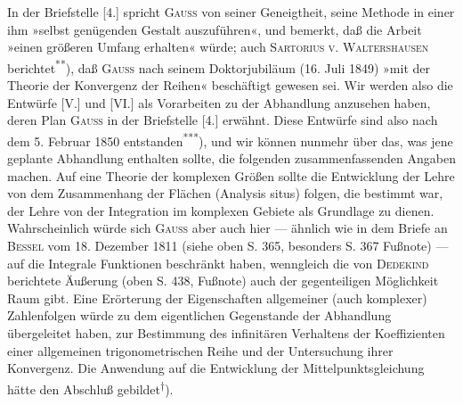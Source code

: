 \par\medskip\indent In der Briefstelle [4.] spricht \textsc{Gauss} von seiner Geneigtheit, seine Methode in einer ihm »selbst genügenden Gestalt auszuführen«, und bemerkt, daß die Arbeit »einen größeren Umfang erhalten« würde; auch \textsc{Sartorius v. Waltershausen} berichtet\textsuperscript{**}), daß \textsc{Gauss} nach seinem Doktorjubiläum (16. Juli 1849) »mit der Theorie der Konvergenz der Reihen« beschäftigt gewesen sei. Wir werden also die Entwürfe [V.] und [VI.] als Vorarbeiten zu der Abhandlung anzusehen haben, deren Plan \textsc{Gauss} in der Briefstelle [4.] erwähnt. Diese Entwürfe sind also nach dem 5. Februar 1850 entstanden\textsuperscript{***}), und wir können nunmehr über das, was jene geplante Abhandlung enthalten sollte, die folgenden zusammenfassenden Angaben machen. Auf eine Theorie der komplexen Größen sollte die Entwicklung der Lehre von dem Zusammenhang der Flächen (Analysis situs) folgen, die bestimmt war, der Lehre von der Integration im komplexen Gebiete als Grundlage zu dienen. Wahrscheinlich würde sich \textsc{Gauss} aber auch hier — ähnlich wie in dem Briefe an \textsc{Bessel} vom 18. Dezember 1811 (siehe oben S. 365, besonders S. 367 Fußnote) — auf die Integrale  Funktionen beschränkt haben, wenngleich die von \textsc{Dedekind} berichtete Äußerung (oben S. 438, Fußnote) auch der gegenteiligen Möglichkeit Raum gibt. Eine Erörterung der Eigenschaften allgemeiner (auch komplexer) Zahlenfolgen würde zu dem eigentlichen Gegenstande der Abhandlung übergeleitet haben, zur Bestimmung des infinitären Verhaltens der Koeffizienten einer allgemeinen trigonometrischen Reihe und der Untersuchung ihrer Konvergenz. Die Anwendung auf die Entwicklung der Mittelpunktsgleichung hätte den Abschluß gebildet\textsuperscript{†}).

